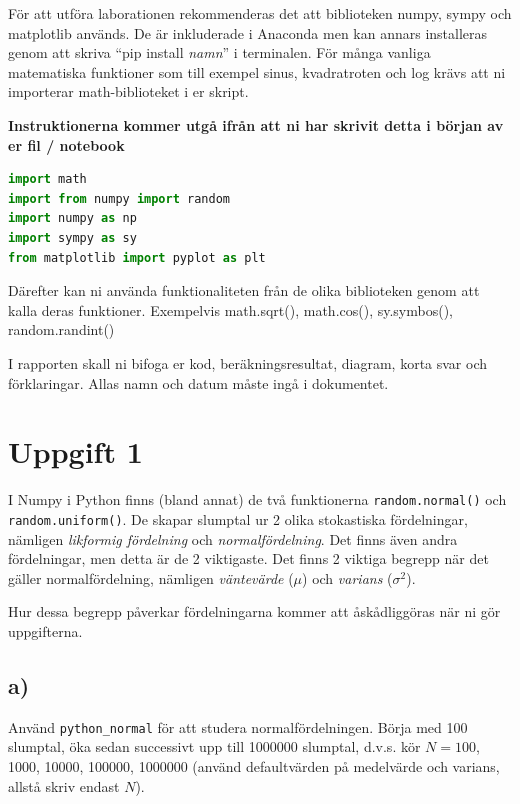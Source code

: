 \documentclass[a4paper]{article}
\begin{document}
För att utföra laborationen rekommenderas det att biblioteken numpy,
sympy och matplotlib används. De är inkluderade i Anaconda men kan annars installeras genom att
skriva ``pip install \textit{namn}'' i terminalen. För många vanliga matematiska funktioner som till
exempel sinus, kvadratroten och log krävs att ni importerar math-biblioteket i er skript.

\textbf{Instruktionerna kommer utgå ifrån att ni har skrivit detta i början av er fil / notebook}
\begin{lstlisting}[language=Python] 
import math
import from numpy import random
import numpy as np
import sympy as sy
from matplotlib import pyplot as plt
\end{lstlisting}

Därefter kan ni använda funktionaliteten från de olika biblioteken genom att
kalla deras funktioner. Exempelvis math.sqrt(), math.cos(), sy.symbos(), random.randint()

I rapporten skall ni bifoga er kod, beräkningsresultat, diagram, korta svar och förklaringar.
Allas namn och datum måste ingå i dokumentet.


\newpage
\section{Uppgift 1}
I Numpy i Python finns (bland annat) de två funktionerna \lstinline{random.normal()} och \lstinline{random.uniform()}.
De skapar slumptal ur 2 olika stokastiska fördelningar, nämligen \textit{likformig fördelning} och \textit{normalfördelning}.
Det finns även andra fördelningar, men detta är de 2 viktigaste. Det finns 2 viktiga begrepp när det gäller
normalfördelning, nämligen \textit{väntevärde} (\(\mu\)) och \textit{varians} (\(\sigma^2\)).

Hur dessa begrepp påverkar fördelningarna kommer att åskådliggöras när ni gör uppgifterna.

\subsection{a)}
Använd \lstinline{python_normal} för att studera normalfördelningen. Börja med 100 slumptal,
öka sedan successivt upp till 1000000 slumptal, d.v.s. kör \( N=100 \), 1000, 10000,
100000, 1000000 (använd defaultvärden på medelvärde och varians, allstå skriv endast \( N \)).
\end{document}
